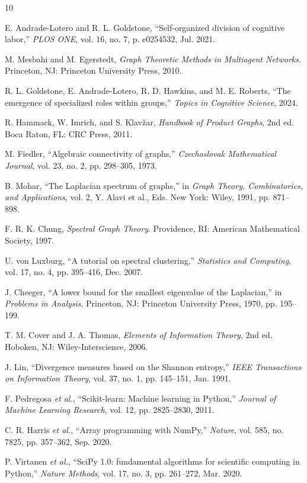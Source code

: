\documentclass[journal]{IEEEtran}
\begin{document}

\begin{thebibliography}{10}

E. Andrade-Lotero and R. L. Goldstone, ``Self-organized division of cognitive labor,'' \textit{PLOS ONE}, vol. 16, no. 7, p. e0254532, Jul. 2021.

M. Mesbahi and M. Egerstedt, \textit{Graph Theoretic Methods in Multiagent Networks}. Princeton, NJ: Princeton University Press, 2010.

R. L. Goldstone, E. Andrade-Lotero, R. D. Hawkins, and M. E. Roberts, ``The emergence of specialized roles within groups,'' \textit{Topics in Cognitive Science}, 2024.

R. Hammack, W. Imrich, and S. Klav\v{z}ar, \textit{Handbook of Product Graphs}, 2nd ed. Boca Raton, FL: CRC Press, 2011.

M. Fiedler, ``Algebraic connectivity of graphs,'' \textit{Czechoslovak Mathematical Journal}, vol. 23, no. 2, pp. 298--305, 1973.

B. Mohar, ``The Laplacian spectrum of graphs,'' in \textit{Graph Theory, Combinatorics, and Applications}, vol. 2, Y. Alavi et al., Eds. New York: Wiley, 1991, pp. 871--898.

F. R. K. Chung, \textit{Spectral Graph Theory}. Providence, RI: American Mathematical Society, 1997.

U. von Luxburg, ``A tutorial on spectral clustering,'' \textit{Statistics and Computing}, vol. 17, no. 4, pp. 395--416, Dec. 2007.

J. Cheeger, ``A lower bound for the smallest eigenvalue of the Laplacian,'' in \textit{Problems in Analysis}. Princeton, NJ: Princeton University Press, 1970, pp. 195--199.

T. M. Cover and J. A. Thomas, \textit{Elements of Information Theory}, 2nd ed. Hoboken, NJ: Wiley-Interscience, 2006.

J. Lin, ``Divergence measures based on the Shannon entropy,'' \textit{IEEE Transactions on Information Theory}, vol. 37, no. 1, pp. 145--151, Jan. 1991.

F. Pedregosa \emph{et al.}, ``Scikit-learn: Machine learning in Python,'' \textit{Journal of Machine Learning Research}, vol. 12, pp. 2825--2830, 2011.

C. R. Harris \emph{et al.}, ``Array programming with NumPy,'' \textit{Nature}, vol. 585, no. 7825, pp. 357--362, Sep. 2020.

P. Virtanen \emph{et al.}, ``SciPy 1.0: fundamental algorithms for scientific computing in Python,'' \textit{Nature Methods}, vol. 17, no. 3, pp. 261--272, Mar. 2020.

\end{thebibliography}
\end{document}
